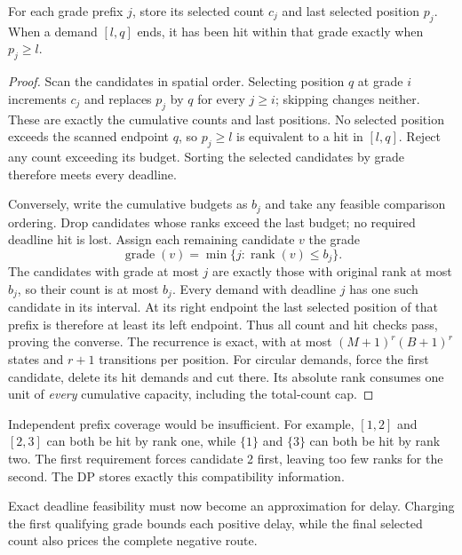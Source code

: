 \begin{claim}
\label{clm:qp-prefix-state}
For each grade prefix $j$, store its selected count $c_j$ and last
selected position $p_j$. When a demand $[l,q]$ ends, it has been
hit within that grade exactly when $p_j\ge l$.
\end{claim}
\begin{proof}
Scan the candidates in spatial order. Selecting position $q$ at
grade $i$ increments $c_j$ and replaces $p_j$ by $q$ for every
$j\ge i$; skipping changes neither. These are exactly the cumulative
counts and last positions. No selected position exceeds the scanned
endpoint $q$, so $p_j\ge l$ is equivalent to a hit in $[l,q]$.
Reject any count exceeding its budget. Sorting the selected
candidates by grade therefore meets every deadline.

Conversely, write the cumulative budgets as $b_j$ and take any
feasible comparison ordering. Drop candidates whose ranks exceed
the last budget; no required deadline hit is lost. Assign each
remaining candidate $v$ the grade
\[
 \operatorname{grade}(v)
   =\min\{j:\operatorname{rank}(v)\le b_j\}.
\]
The candidates with grade at most $j$ are exactly those with
original rank at most $b_j$, so their count is at most $b_j$.
Every demand with deadline $j$ has one such candidate in its
interval. At its right endpoint the last selected position of
that prefix is therefore at least its left endpoint. Thus all
count and hit checks pass, proving the converse. The recurrence
is exact, with at most
$(M+1)^r(B+1)^r$ states and $r+1$ transitions per position.
For circular demands, force the first candidate, delete its hit
demands and cut there. Its absolute rank consumes one unit of
\emph{every} cumulative capacity, including the total-count cap.
\end{proof}

Independent prefix coverage would be insufficient. For example,
$[1,2]$ and $[2,3]$ can both be hit by rank one, while
$\{1\}$ and $\{3\}$ can both be hit by rank two. The first
requirement forces candidate 2 first, leaving too few ranks for the
second. The DP stores exactly this compatibility information.

Exact deadline feasibility must now become an approximation for delay.
Charging the first qualifying grade bounds each positive delay, while
the final selected count also prices the complete negative route.

